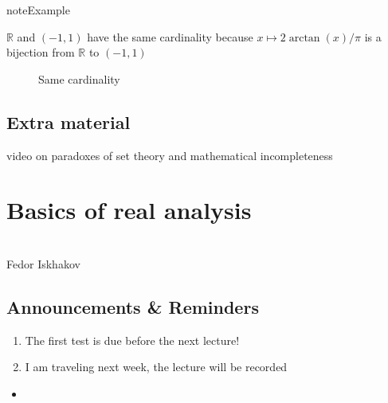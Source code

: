 \documentclass[letterpaper,10pt,english]{jupyterBook}
\begin{document}
\begin{sphinxadmonition}{note}{Example}

\sphinxAtStartPar
\(\mathbb{R}\) and \((-1, 1)\) have the same cardinality because \(x \mapsto 2\arctan(x)/\pi\) is a bijection from \(\mathbb{R}\) to \((-1, 1)\)
\end{sphinxadmonition}

\begin{figure}[htbp]
\centering
\capstart

\noindent{}
\caption{Same cardinality}\label{\detokenize{03.set_theory:arctan}}\end{figure}


\section{Extra material}
\label{\detokenize{03.set_theory:extra-material}}
\sphinxAtStartPar
{} video on paradoxes of set theory and mathematical incompleteness 

\sphinxstepscope


\chapter{Basics of real analysis}
\label{\detokenize{04.basic_analysis:basics-of-real-analysis}}\label{\detokenize{04.basic_analysis::doc}}
\sphinxAtStartPar
{}\\
Fedor Iskhakov


\section{Announcements \& Reminders}
\label{\detokenize{04.basic_analysis:announcements-reminders}}\begin{enumerate}
%
\item {} 
\sphinxAtStartPar
The first test is due before the next lecture!

\item {} 
\sphinxAtStartPar
I am traveling next week, the lecture will be recorded

\end{enumerate}
\begin{itemize}
\item {} 
\sphinxAtStartPar
{}

\end{itemize}
\end{document}
